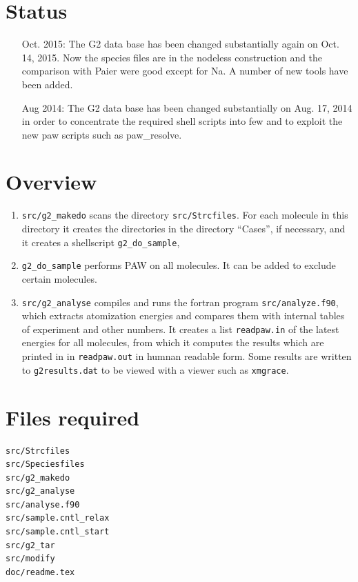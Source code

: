 \documentclass{book}
\begin{document}
\section*{Status}
\begin{itemize}
\item[Oct. 2015:] The G2 data base has been changed substantially
  again on Oct. 14, 2015. Now the species files are in the nodeless
  construction and the comparison with Paier were good except for
  Na. A number of new tools have been added.
%
\item[Aug 2014:] The G2 data base has been changed substantially on
  Aug. 17, 2014 in order to concentrate the required shell scripts
  into few and to exploit the new paw scripts such as paw\_resolve.
%
\end{itemize}

\section*{Overview}
\begin{enumerate}
\item \verb+src/g2_makedo+ scans the directory
  \verb+src/Strcfiles+. For each molecule in this directory it creates
  the directories in the directory ``Cases'', if necessary, and it
  creates a shellscript \verb|g2_do_sample|,
\item \verb|g2_do_sample| performs PAW on all molecules. It can be
  added to exclude certain molecules.
\item \verb+src/g2_analyse+ compiles and runs the fortran program
  \verb|src/analyze.f90|, which extracts atomization energies and
  compares them with internal tables of experiment and other numbers.
  It creates a list \verb+readpaw.in+ of the latest energies for all
  molecules, from which it computes the results which are printed in
  in \verb|readpaw.out| in humnan readable form. Some results are
  written to \verb+g2results.dat+ to be viewed with a viewer such as
  \verb|xmgrace|.
\end{enumerate}

\section*{Files required}
\begin{verbatim}
src/Strcfiles         
src/Speciesfiles      
src/g2_makedo         
src/g2_analyse         
src/analyse.f90       
src/sample.cntl_relax 
src/sample.cntl_start
src/g2_tar
src/modify
doc/readme.tex
\end{verbatim}
\end{document}
